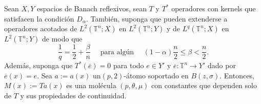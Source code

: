 \begin{lemma}
	Sean $X, Y$ espacios de Banach reflexivos, sean $T$ y  $T^*$ operadores con kernels que satisfacen la condición $D_\alpha$. También, suponga que pueden extenderse a operadores acotados de $L^2(\mathbb{T}^n;X)$ en $L^2(\mathbb{T}^n;Y)$ y de $L^q(\mathbb{T}^n;X)$ en $L^2(\mathbb{T}^n;Y)$ de modo que 
	\begin{equation}
		\frac{1}{q} = \frac{1}{2} + \frac{\beta}{n} \quad \text{ para algún } \quad (1-\alpha)\frac{n}{2}\leq \beta<\frac{n}{2}.
	\end{equation}
	Además, suponga que $T^*(\overline{e})=0$ para todo ${e}\in Y'$ y $\overline{e}:\mathbb{T}^n\rightarrow Y'$ dado por $\overline{e}(x)=e$. Sea $a:=a(x)$ un$(p,2)$-átomo  soportado en $B(z,\sigma)$. Entonces, $M(x):=Ta(x)$ es una molécula $(p, \theta, \mu)$ con constantes que dependen solo de $T$ y sus propiedades de continuidad.
	\label{lem:Ta-is-molecule}
\end{lemma}

